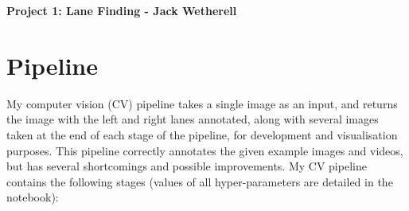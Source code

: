 \documentclass[letterpaper,12pt]{article}
\begin{document}
\title{}
\author{}
\date{}
%


\begin{center}
\textbf{Project 1: Lane Finding - Jack Wetherell} \\
\end{center}


\section{Pipeline}
My computer vision (CV) pipeline takes a single image as an input, and returns the image with the left and right lanes annotated, along with several images taken at the end of each stage of the pipeline, for development and visualisation purposes. This pipeline correctly annotates the given example images and videos, but has several shortcomings and possible improvements. My CV pipeline contains the following stages (values of all hyper-parameters are detailed in the notebook):
\end{document}
